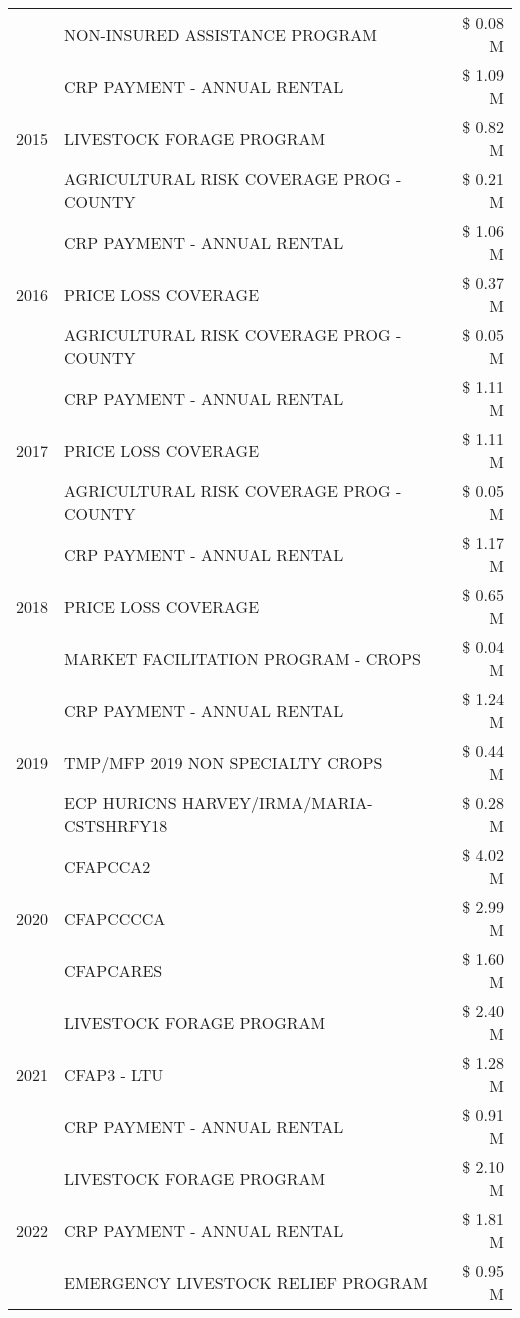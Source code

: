 \begin{tabular}{llr}
 & NON-INSURED ASSISTANCE PROGRAM & \$ 0.08 M \\
\cline{1-3}
\multirow[t]{3}{*}{2015} & CRP PAYMENT - ANNUAL RENTAL & \$ 1.09 M \\
 & LIVESTOCK FORAGE PROGRAM & \$ 0.82 M \\
 & AGRICULTURAL RISK COVERAGE PROG - COUNTY & \$ 0.21 M \\
\cline{1-3}
\multirow[t]{3}{*}{2016} & CRP PAYMENT - ANNUAL RENTAL & \$ 1.06 M \\
 & PRICE LOSS COVERAGE & \$ 0.37 M \\
 & AGRICULTURAL RISK COVERAGE PROG - COUNTY & \$ 0.05 M \\
\cline{1-3}
\multirow[t]{3}{*}{2017} & CRP PAYMENT - ANNUAL RENTAL & \$ 1.11 M \\
 & PRICE LOSS COVERAGE & \$ 1.11 M \\
 & AGRICULTURAL RISK COVERAGE PROG - COUNTY & \$ 0.05 M \\
\cline{1-3}
\multirow[t]{3}{*}{2018} & CRP PAYMENT - ANNUAL RENTAL & \$ 1.17 M \\
 & PRICE LOSS COVERAGE & \$ 0.65 M \\
 & MARKET FACILITATION PROGRAM - CROPS & \$ 0.04 M \\
\cline{1-3}
\multirow[t]{3}{*}{2019} & CRP PAYMENT - ANNUAL RENTAL & \$ 1.24 M \\
 & TMP/MFP 2019 NON SPECIALTY CROPS & \$ 0.44 M \\
 & ECP HURICNS HARVEY/IRMA/MARIA-CSTSHRFY18 & \$ 0.28 M \\
\cline{1-3}
\multirow[t]{3}{*}{2020} & CFAPCCA2 & \$ 4.02 M \\
 & CFAPCCCCA & \$ 2.99 M \\
 & CFAPCARES & \$ 1.60 M \\
\cline{1-3}
\multirow[t]{3}{*}{2021} & LIVESTOCK FORAGE PROGRAM & \$ 2.40 M \\
 & CFAP3 - LTU & \$ 1.28 M \\
 & CRP PAYMENT - ANNUAL RENTAL & \$ 0.91 M \\
\cline{1-3}
\multirow[t]{3}{*}{2022} & LIVESTOCK FORAGE PROGRAM & \$ 2.10 M \\
 & CRP PAYMENT - ANNUAL RENTAL & \$ 1.81 M \\
 & EMERGENCY LIVESTOCK RELIEF PROGRAM & \$ 0.95 M \\
\cline{1-3}
\bottomrule
\end{tabular}
